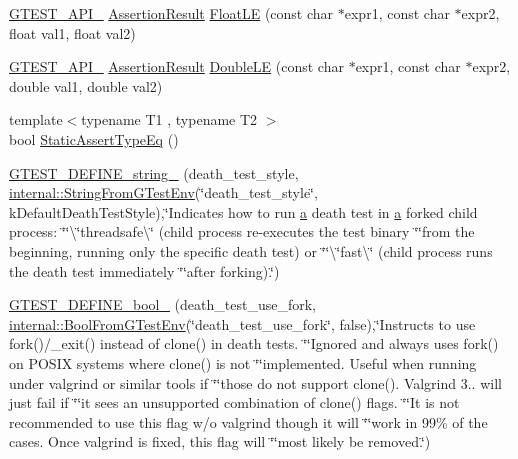 \begin{DoxyCompactItemize}
\item 
\hyperlink{gtest-port_8h_aa73be6f0ba4a7456180a94904ce17790}{G\+T\+E\+S\+T\+\_\+\+A\+P\+I\+\_\+} \hyperlink{classtesting_1_1_assertion_result}{Assertion\+Result} \hyperlink{namespacetesting_a2c9a2a391c72a7b02ea3024586e33af0}{Float\+LE} (const char $\ast$expr1, const char $\ast$expr2, float val1, float val2)
\item 
\hyperlink{gtest-port_8h_aa73be6f0ba4a7456180a94904ce17790}{G\+T\+E\+S\+T\+\_\+\+A\+P\+I\+\_\+} \hyperlink{classtesting_1_1_assertion_result}{Assertion\+Result} \hyperlink{namespacetesting_ae10e2bb304b74abd1b06a2d912a8b43b}{Double\+LE} (const char $\ast$expr1, const char $\ast$expr2, double val1, double val2)
\item 
{\footnotesize template$<$typename T1 , typename T2 $>$ }\\bool \hyperlink{namespacetesting_a661e70fc6afeb5c085eed3716aa45059}{Static\+Assert\+Type\+Eq} ()
\item 
\hyperlink{namespacetesting_ad93c9ec89517d047ed323b79d96df251}{G\+T\+E\+S\+T\+\_\+\+D\+E\+F\+I\+N\+E\+\_\+string\+\_\+} (death\+\_\+test\+\_\+style, \hyperlink{namespacetesting_1_1internal_ac54dabc540bf79c2de91add679bfb93b}{internal\+::\+String\+From\+G\+Test\+Env}(\char`\"{}death\+\_\+test\+\_\+style\char`\"{}, k\+Default\+Death\+Test\+Style),\char`\"{}Indicates how to run \hyperlink{_07copy_08_2_read_camera_model_8m_a551a3d351eadcc0b9b1a2f24f0fb5ea0}{a} death test in \hyperlink{_07copy_08_2_read_camera_model_8m_a551a3d351eadcc0b9b1a2f24f0fb5ea0}{a} forked child process\+: \char`\"{}\char`\"{}\textbackslash{}\char`\"{}threadsafe\textbackslash{}\char`\"{} (child process re-\/executes the test binary \char`\"{}\char`\"{}from the beginning, running only the specific death test) or \char`\"{}\char`\"{}\textbackslash{}\char`\"{}fast\textbackslash{}\char`\"{} (child process runs the death test immediately \char`\"{}\char`\"{}after forking).\char`\"{})
\item 
\hyperlink{namespacetesting_afee59458b05682d57d3a389e0903bc01}{G\+T\+E\+S\+T\+\_\+\+D\+E\+F\+I\+N\+E\+\_\+bool\+\_\+} (death\+\_\+test\+\_\+use\+\_\+fork, \hyperlink{namespacetesting_1_1internal_a67132cdce23fb71b6c38ee34ef81eb4c}{internal\+::\+Bool\+From\+G\+Test\+Env}(\char`\"{}death\+\_\+test\+\_\+use\+\_\+fork\char`\"{}, false),\char`\"{}Instructs to use fork()/\+\_\+exit() instead of clone() in death tests. \char`\"{}\char`\"{}Ignored and always uses fork() on P\+O\+S\+IX systems where clone() is not \char`\"{}\char`\"{}implemented. Useful when running under valgrind or similar tools if \char`\"{}\char`\"{}those do not support clone(). Valgrind 3.. will just fail if \char`\"{}\char`\"{}it sees an unsupported combination of clone() flags. \char`\"{}\char`\"{}It is not recommended to use this flag w/o valgrind though it will \char`\"{}\char`\"{}work in 99\% of the cases. Once valgrind is fixed, this flag will \char`\"{}\char`\"{}most likely be removed.\char`\"{})

\end{DoxyCompactItemize}
